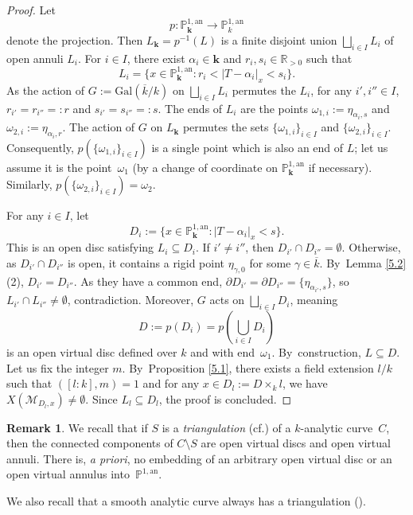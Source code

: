 \documentclass[10pt]{amsart}
\newcommand{\cf}{cf.}
\newcommand{\bbk}{{\boldsymbol{k}}}%
\let\backslash\setminus
\theoremstyle{definition}
\newtheorem{rem}[thm]{Remark}
\begin{document}
\begin{proof}
Let
\[
p: \mathbb{P}_{\bbk}^{1, \mathrm{an}} \to \mathbb{P}_k^{1, \mathrm{an}}
\]
denote the projection. Then $L_{\bbk}=p^{-1}(L)$ is a finite disjoint union $\bigsqcup_{i \in I} L_i$ of open annuli $L_i$. For $i \in I$, there exist $\alpha_i \in \bbk$ and $r_i, s_i \in \mathbb{R}_{>0}$ such that
\[
L_i=\{x \in \mathbb{P}_{\bbk}^{1, \mathrm{an}}: r_i < |T-\alpha_i|_x <s_i\}.
\]
As the action of $G:=\mathrm{Gal}(\overline{k}/k)$ on $\bigsqcup_{i \in I}L_i$ permutes the $L_i$, for any $i', i'' \in I$, $r_{i'}=r_{i''}=:r$ and $s_{i'}=s_{i''}=:s$. The ends of $L_i$ are the points $\omega_{1,i}:=\eta_{\alpha_i, s}$ and $\omega_{2,i}:=\eta_{\alpha_i,r}$. The action of $G$ on $L_{\bbk}$ permutes the sets $\{\omega_{1,i}\}_{i \in I}$ and $\{\omega_{2,i}\}_{i \in I}$. Consequently, $p(\{\omega_{1,i}\}_{i \in I})$ is a single point which is also an end of $L$; let us assume it is the point~$\omega_1$ (by a change of coordinate on $\mathbb{P}_{\bbk}^{1, \mathrm{an}}$ if necessary). Similarly, $p(\{\omega_{2,i}\}_{i \in I})=\omega_2$.

For any $i \in I$, let
\[
D_i:=\{x \in \mathbb{P}_{\bbk}^{1, \mathrm{an}}: |T-\alpha_i|_x <s\}.
\]
This is an open disc satisfying $L_i \subseteq D_i$. If $i' \neq i''$, then $D_{i'} \cap D_{i''} =\emptyset$. Otherwise, as $D_{i'} \cap D_{i''}$ is open, it contains a rigid point $\eta_{\gamma, 0}$ for some $\gamma \in \overline{k}$. By~Lemma \ref{5.2}(2), $D_{i'}=D_{i''}$.
As they have a common end, $\partial{D_{i'}}=\partial{D_{i''}}=\{\eta_{\alpha_{i'},s}\}$, so
$L_{i'} \cap L_{i''} \neq \emptyset$, contradiction. Moreover, $G$ acts on $\bigsqcup_{i \in I}D_i$, meaning
\[
D:=p(D_i)=p(\bigcup_{i \in I}D_i)
\]
is an open virtual disc defined over $k$ and with end~$\omega_1$. By~construction, $L \subseteq D$.
Let us fix the integer $m$. By~Proposition \ref{5.1}, there exists a field extension $l/k$ such that $([l:k], m)=1$ and for any $x \in D_{l}:=D \times_k l$, we have $X(\mathscr{M}_{D_l, x}) \neq \emptyset$. Since $L_l \subseteq D_l$, the proof is concluded.
\end{proof}

\begin{rem} \label{5.5.2}
We recall that if $S$ is a \emph{triangulation} (\cf \cite[5.1.13]{duc}) of a $k$-analytic curve~$C$, then the connected components of $C \backslash S$ are open virtual discs and open virtual annuli. There is, \emph{a priori}, no embedding of an arbitrary open virtual disc or an open virtual annulus into~$\mathbb{P}^{1, \mathrm{an}}$.

We also recall that a smooth analytic curve always has a triangulation (\cite[Th.\,5.1.14]{duc}).
\end{rem}
\end{document}
